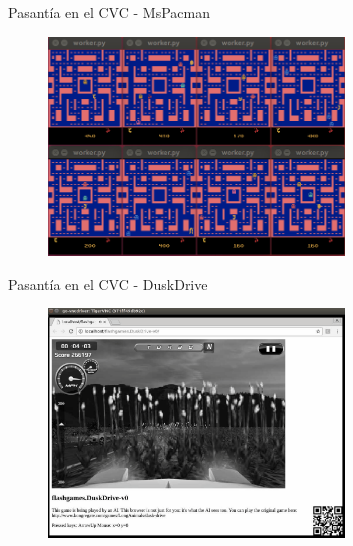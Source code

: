\documentclass[usenames,dvipsnames]{beamer} %
\begin{document}
\begin{frame}{Pasant\'ia en el CVC - MsPacman}

\begin{figure}
	\centering
	\includegraphics[width=0.70\textwidth]{mspacman/mspacman-0.png}
\end{figure}

\end{frame}

\begin{frame}{Pasant\'ia en el CVC - DuskDrive}
\begin{figure}
	\centering
	\includegraphics[width=0.70\textwidth]{dusk/dusk-0.png}
\end{figure}

\end{frame}
\end{document}
